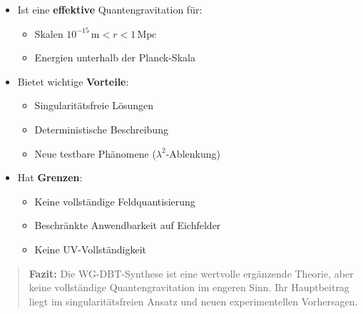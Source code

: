 \begin{itemize}
\item Ist eine \textbf{effektive} Quantengravitation für:
\begin{itemize}
\item Skalen $10^{-15}\,\text{m} < r < 1\,\text{Mpc}$
\item Energien unterhalb der Planck-Skala
\end{itemize}

\item Bietet wichtige \textbf{Vorteile}:
\begin{itemize}
\item Singularitätsfreie Lösungen
\item Deterministische Beschreibung
\item Neue testbare Phänomene ($\lambda^2$-Ablenkung)
\end{itemize}

\item Hat \textbf{Grenzen}:
\begin{itemize}
\item Keine vollständige Feldquantisierung
\item Beschränkte Anwendbarkeit auf Eichfelder
\item Keine UV-Vollständigkeit
\end{itemize}
\end{itemize}

\begin{quote}
\textbf{Fazit:} Die WG-DBT-Synthese ist eine wertvolle ergänzende Theorie, aber keine vollständige Quantengravitation im engeren Sinn. Ihr Hauptbeitrag liegt im singularitätsfreien Ansatz und neuen experimentellen Vorhersagen.
\end{quote}
